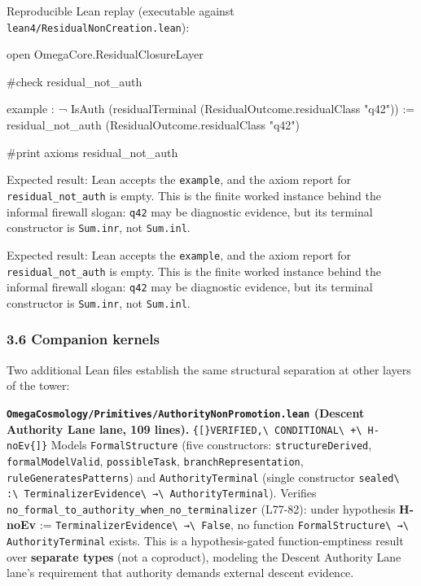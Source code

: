 \documentclass[
  10pt,
]{article}
\newenvironment{Shaded}{}{}
\newcommand{\NormalTok}[1]{#1}
\DeclareRobustCommand{\texttt}[1]{{\paperSymbolFont\nolinkurl{#1}}}
\begin{document}
Reproducible Lean replay (executable against \texttt{lean4/ResidualNonCreation.lean}):

\begin{Shaded}
\begin{Highlighting}[]
\NormalTok{open OmegaCore.ResidualClosureLayer}

\NormalTok{\#check residual\_not\_auth}

\NormalTok{example :}
\NormalTok{    ¬ IsAuth}
\NormalTok{      (residualTerminal}
\NormalTok{        (ResidualOutcome.residualClass "q42")) :=}
\NormalTok{  residual\_not\_auth}
\NormalTok{    (ResidualOutcome.residualClass "q42")}

\NormalTok{\#print axioms residual\_not\_auth}
\end{Highlighting}
\end{Shaded}

Expected result: Lean accepts the \texttt{example}, and the axiom report for \texttt{residual\_not\_auth} is empty. This is the finite worked instance behind the informal firewall slogan: \texttt{q42} may be diagnostic evidence, but its terminal constructor is \texttt{Sum.inr}, not \texttt{Sum.inl}.

Expected result: Lean accepts the \texttt{example}, and the axiom report for \texttt{residual\_not\_auth} is empty. This is the finite worked instance behind the informal firewall slogan: \texttt{q42} may be diagnostic evidence, but its terminal constructor is \texttt{Sum.inr}, not \texttt{Sum.inl}.

\subsubsection{3.6 Companion kernels}\label{companion-kernels}

Two additional Lean files establish the same structural separation at other layers of the tower:

\textbf{\texttt{OmegaCosmology/Primitives/AuthorityNonPromotion.lean} (Descent Authority Lane lane, 109 lines).} \texttt{{[}VERIFIED,\ CONDITIONAL\ +\ H-noEv{]}} Models \texttt{FormalStructure} (five constructors: \texttt{structureDerived}, \texttt{formalModelValid}, \texttt{possibleTask}, \texttt{branchRepresentation}, \texttt{ruleGeneratesPatterns}) and \texttt{AuthorityTerminal} (single constructor \texttt{sealed\ :\ TerminalizerEvidence\ →\ AuthorityTerminal}). Verifies \texttt{no\_formal\_to\_authority\_when\_no\_terminalizer} (L77-82): under hypothesis \textbf{H-noEv} := \texttt{TerminalizerEvidence\ →\ False}, no function \texttt{FormalStructure\ →\ AuthorityTerminal} exists. This is a hypothesis-gated function-emptiness result over \textbf{separate types} (not a coproduct), modeling the Descent Authority Lane lane's requirement that authority demands external descent evidence.
\end{document}
